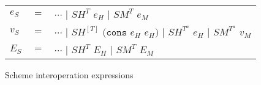 \begin{figure}[p]
\centering
\begin{tabular}{lcl}
$e_{S}$ & $=$ & $\cdots$ $\vert$ $SH^{T}$ $e_{H}$ $\vert$ $SM^{T}$ $e_{M}$ \\
$v_{S}$ & $=$ & $\cdots$ $\vert$ $SH^{[T]}$ $(\mathtt{cons}$ $e_{H}$ $e_{H})$ $\vert$ $SH^{T^{a}}$ $e_{H}$ $\vert$ $SM^{T^{a}}$ $v_{M}$ \\
$E_{S}$ & $=$ & $\cdots$ $\vert$ $SH^{T}$ $E_{H}$ $\vert$ $SM^{T}$ $E_{M}$
\end{tabular}
\caption{Scheme interoperation expressions}
\label{sie}
\end{figure}